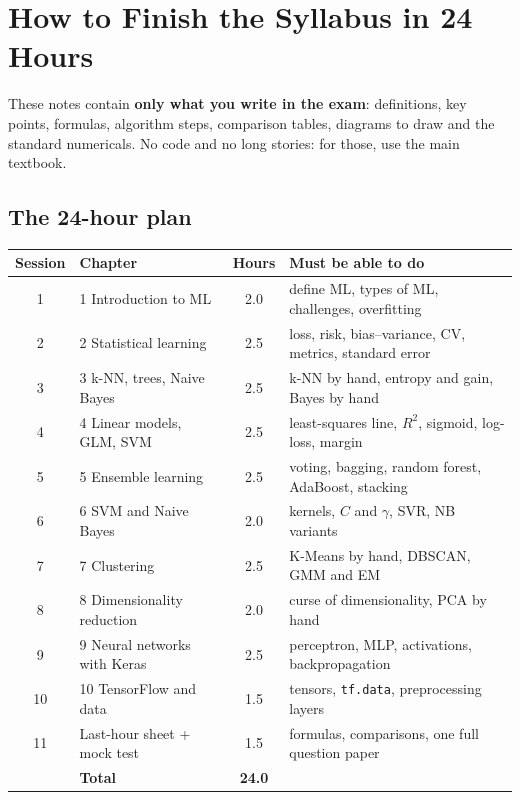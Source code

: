 \chapter*{How to Finish the Syllabus in 24 Hours}

These notes contain \textbf{only what you write in the exam}: definitions, key points, formulas, algorithm steps, comparison tables, diagrams to draw and the standard numericals. No code and no long stories: for those, use the main textbook.

\section*{The 24-hour plan}
\begin{center}
\small
\begin{tabular}{@{}clcp{7.4cm}@{}}
\toprule
\textbf{Session} & \textbf{Chapter} & \textbf{Hours} & \textbf{Must be able to do}\\
\midrule
1 & 1 Introduction to ML & 2.0 & define ML, types of ML, challenges, overfitting\\
2 & 2 Statistical learning & 2.5 & loss, risk, bias--variance, CV, metrics, standard error\\
3 & 3 k-NN, trees, Naive Bayes & 2.5 & k-NN by hand, entropy and gain, Bayes by hand\\
4 & 4 Linear models, GLM, SVM & 2.5 & least-squares line, $R^2$, sigmoid, log-loss, margin\\
5 & 5 Ensemble learning & 2.5 & voting, bagging, random forest, AdaBoost, stacking\\
6 & 6 SVM and Naive Bayes & 2.0 & kernels, $C$ and $\gamma$, SVR, NB variants\\
7 & 7 Clustering & 2.5 & K-Means by hand, DBSCAN, GMM and EM\\
8 & 8 Dimensionality reduction & 2.0 & curse of dimensionality, PCA by hand\\
9 & 9 Neural networks with Keras & 2.5 & perceptron, MLP, activations, backpropagation\\
10 & 10 TensorFlow and data & 1.5 & tensors, \texttt{tf.data}, preprocessing layers\\
11 & Last-hour sheet + mock test & 1.5 & formulas, comparisons, one full question paper\\
\midrule
 & \textbf{Total} & \textbf{24.0} & \\
\bottomrule
\end{tabular}
\end{center}

